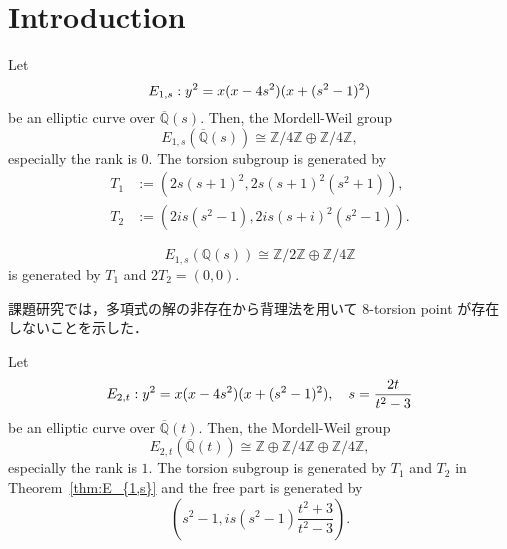 \documentclass[main]{subfiles}
\begin{document}
\chapter{Introduction}

\begin{thm}
    \label{thm:E_{1,s}}
    Let
    \begin{equation}
        \label{eq:E_{1s}}
        E_{1,s}: y^{2} = x(x - 4s^{2})(x + (s^{2} - 1)^{2})
    \end{equation}
    be an elliptic curve over $\overline{\mathbb{Q}}(s)$.
    Then, the Mordell-Weil group
    \begin{equation}
        E_{1,s}(\overline{\mathbb{Q}}(s)) \cong \mathbb{Z} / 4 \mathbb{Z} \oplus \mathbb{Z} / 4 \mathbb{Z},
    \end{equation}
    especially the rank is $0$. The torsion subgroup is generated by
    \begin{align}
        T_1 & := (2s(s+1)^2, 2s(s+1)^2(s^2+1)),   \\
        T_2 & := (2is(s^2-1),2is(s+i)^2(s^2-1)).
    \end{align}
\end{thm}

\begin{cor}
    \begin{equation}
        E_{1,s}(\mathbb{Q}(s)) \cong \mathbb{Z} / 2 \mathbb{Z} \oplus \mathbb{Z} / 4 \mathbb{Z}
    \end{equation}
    is generated by $T_1$ and $2T_2=(0,0)$.
\end{cor}

\begin{rem}
    課題研究では，多項式の解の非存在から背理法を用いて 8-torsion point が存在しないことを示した．
\end{rem}

\begin{thm}
    \label{thm:E_{2,t}}
    Let
    \begin{equation}
        \label{eq:E_{4t}}
        E_{2,t}: y^{2} = x(x - 4s^{2})(x + (s^{2} - 1)^{2}),\quad s = \frac{2t}{t^{2} - 3}
    \end{equation}
    be an elliptic curve over $\overline{\mathbb{Q}}(t)$.
    Then, the Mordell-Weil group
    \begin{equation}
        E_{2,t}(\overline{\mathbb{Q}}(t)) \cong \mathbb{Z} \oplus \mathbb{Z} / 4 \mathbb{Z} \oplus \mathbb{Z} / 4 \mathbb{Z},
    \end{equation}
    especially the rank is $1$.
    The torsion subgroup is generated by $T_1$ and $T_2$ in Theorem~\ref{thm:E_{1,s}} and the free part is generated by
    \begin{equation}
        \left(s^{2} - 1, i s(s^{2} - 1) \frac{t^{2} + 3}{t^{2} - 3} \right).
    \end{equation}
\end{thm}
\end{document}
